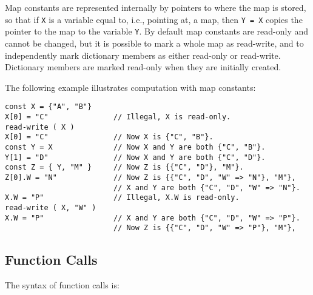 \documentclass[12pt]{article}
\newenvironment{indpar}[1][0.3in]%
	{\begin{list}{}%
		     {\setlength{\itemsep}{0in}%
		      \setlength{\topsep}{0in}%
		      \setlength{\parsep}{1ex}%
		      \setlength{\labelwidth}{#1}%
		      \setlength{\leftmargin}{#1}%
		      \addtolength{\leftmargin}{\labelsep}}%
	 \item}%
	{\end{list}}
\begin{document}
Map constants are represented internally by pointers to where
the map is stored, so that if {\tt X} is a variable equal to,
i.e., pointing at, a map, then {\tt Y = X} copies the pointer
to the map to the variable {\tt Y}.  By default map constants
are read-only and cannot be changed, but it is possible to mark
a whole map as read-write, and to independently mark dictionary members
as either read-only or read-write.
Dictionary members are marked read-only when they are initially created.

The following example illustrates
computation with map constants:
\begin{indpar}\begin{verbatim}
const X = {"A", "B"}
X[0] = "C"               // Illegal, X is read-only.
read-write ( X )
X[0] = "C"               // Now X is {"C", "B"}.
const Y = X              // Now X and Y are both {"C", "B"}. 
Y[1] = "D"               // Now X and Y are both {"C", "D"}. 
const Z = { Y, "M" }     // Now Z is {{"C", "D"}, "M"}.
Z[0].W = "N"             // Now Z is {{"C", "D", "W" => "N"}, "M"},
                         // X and Y are both {"C", "D", "W" => "N"}.
X.W = "P"                // Illegal, X.W is read-only.
read-write ( X, "W" )
X.W = "P"                // X and Y are both {"C", "D", "W" => "P"}.
                         // Now Z is {{"C", "D", "W" => "P"}, "M"},
\end{verbatim}\end{indpar}

\subsection{Function Calls}
\label{FUNCTION-CALLS}

The syntax of function calls is:
\end{document}
